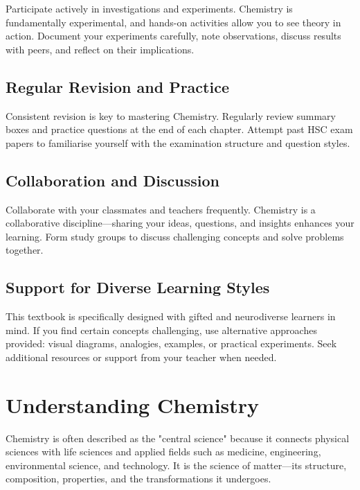 Participate actively in investigations and experiments. Chemistry is fundamentally experimental, and hands-on activities allow you to see theory in action. Document your experiments carefully, note observations, discuss results with peers, and reflect on their implications.

\subsection{Regular Revision and Practice}
\FloatBarrier
\FloatBarrier
\FloatBarrier

Consistent revision is key to mastering Chemistry. Regularly review summary boxes and practice questions at the end of each chapter. Attempt past HSC exam papers to familiarise yourself with the examination structure and question styles.

\subsection{Collaboration and Discussion}
\FloatBarrier
\FloatBarrier
\FloatBarrier

Collaborate with your classmates and teachers frequently. Chemistry is a collaborative discipline—sharing your ideas, questions, and insights enhances your learning. Form study groups to discuss challenging concepts and solve problems together.

\subsection{Support for Diverse Learning Styles}
\FloatBarrier
\FloatBarrier
\FloatBarrier

This textbook is specifically designed with gifted and neurodiverse learners in mind. If you find certain concepts challenging, use alternative approaches provided: visual diagrams, analogies, examples, or practical experiments. Seek additional resources or support from your teacher when needed.

\section{Understanding Chemistry}
\FloatBarrier
\FloatBarrier
\FloatBarrier

Chemistry is often described as the "central science" because it connects physical sciences with life sciences and applied fields such as medicine, engineering, environmental science, and technology. It is the science of matter—its structure, composition, properties, and the transformations it undergoes.

